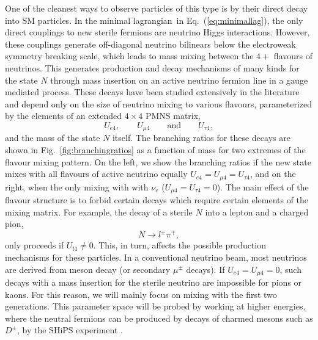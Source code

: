 \documentclass[11pt, a4paper]{article}
\newcommand{\refeq}[1]{Eq.~(\ref{#1})}
\newcommand{\reffig}[1]{Fig.~\ref{#1}}
\def\lagrangian{lagrangian}
\begin{document}
One of the cleanest ways to observe particles of this type is by their direct
decay into SM particles. In the minimal \lagrangian\ in \refeq{eq:minimallag},
the only direct couplings to new sterile fermions are neutrino Higgs
interactions. However, these couplings generate off-diagonal neutrino bilinears
below the electroweak symmetry breaking scale, which leads to mass mixing
between the $4+$ flavours of neutrinos. This generates production and decay
mechanisms of many kinds for the state $N$ through mass insertion on an active
neutrino fermion line in a gauge mediated process. These decays have been
studied extensively in the literature \cite{Atre:2009rg} and depend only on the
size of neutrino mixing to various flavours, parameterized by the elements of
an extended $4\times4$ PMNS matrix,
%
\[ U_{e4}, \qquad U_{\mu 4} \qquad \text{and} \qquad U_{\tau 4},  \]
%
and the mass of the state $N$ itself. The branching ratios for these decays are
shown in \reffig{fig:branchingratios} as a function of mass for two extremes of
the flavour mixing pattern. On the left, we show the branching ratios if the
new state mixes with all flavours of active neutrino equally $U_{e4}=U_{\mu
4}=U_{\tau 4}$, and on the right, when the only mixing with with $\nu_e$
($U_{\mu 4}=U_{\tau 4} = 0$). The main effect of the flavour structure is to
forbid certain decays which require certain elements of the mixing matrix. For
example, the decay of a sterile $N$ into a lepton and a charged pion,
%
\[ N \to l^\pm \pi^\mp,   \]
%
only proceeds if $U_{l4}\neq 0$. This, in turn, affects the possible production
mechanisms for these particles. In a conventional neutrino beam, most neutrinos
are derived from meson decay (or secondary $\mu^\pm$ decays). If $U_{e4}=U_{\mu
4}=0$, such decays with a mass insertion for the sterile neutrino are
impossible for pions or kaons. For this reason, we will mainly focus on mixing
with the first two generations. This parameter space will be probed by working
at higher energies, where the neutral fermions can be produced by decays of
charmed mesons such as $D^\pm$, by the SHiPS experiment \cite{}.
 
\end{document}
